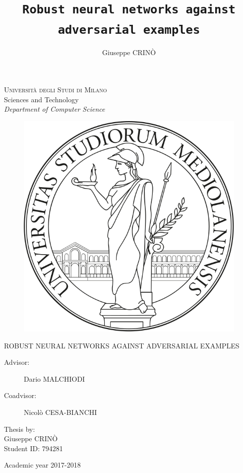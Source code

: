 \documentclass{mimosis}
\title{\texttt{Robust neural networks against adversarial examples}}
\author{Giuseppe CRIN\`O}
\begin{document}
\frontmatter
  \begin{titlepage}
  \begin{center}
      \Large
      \textsc{Universit\`a degli Studi di Milano} \\
      Sciences and Technology \\
      \emph{Department of Computer Science}
  \end{center}
  \begin{figure}[H]
    \centering
    \includegraphics[width=0.5\linewidth]{logo-unimi.png}
  \end{figure}
	\begin{center}
		\Large ROBUST NEURAL NETWORKS AGAINST ADVERSARIAL EXAMPLES
	\end{center}
	\vfill
  \begin{description}
  \item[Advisor:] Dario MALCHIODI
  \item[Coadvisor:] Nicol\`o CESA-BIANCHI
  \end{description}
        \null\hfill
        \parbox{3in} {
          Thesis by: \\
          \expandafter{Giuseppe CRIN\`O} \\ 
          Student ID: 794281
        }
        \vfill
	\begin{center}
    \Large Academic year 2017-2018
  \end{center}
  \end{titlepage}

  \newpage
  \null
  \thispagestyle{empty}
  \newpage

  \tableofcontents

\mainmatter

  
  
  
  
  



\end{document}

